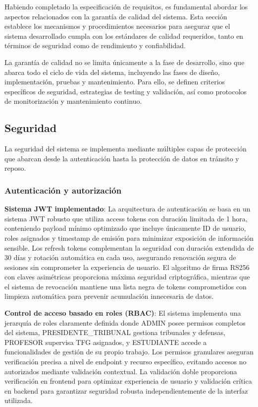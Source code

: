 \documentclass[12pt,a4paper,oneside]{report}
\begin{document}
Habiendo completado la especificación de requisitos, es fundamental
abordar los aspectos relacionados con la garantía de calidad del
sistema. Esta sección establece los mecanismos y procedimientos
necesarios para asegurar que el sistema desarrollado cumpla con los
estándares de calidad requeridos, tanto en términos de seguridad como de
rendimiento y confiabilidad.

La garantía de calidad no se limita únicamente a la fase de desarrollo,
sino que abarca todo el ciclo de vida del sistema, incluyendo las fases
de diseño, implementación, pruebas y mantenimiento. Para ello, se
definen criterios específicos de seguridad, estrategias de testing y
validación, así como protocolos de monitorización y mantenimiento
continuo.

\subsection{Seguridad}\label{seguridad-1}

La seguridad del sistema se implementa mediante múltiples capas de
protección que abarcan desde la autenticación hasta la protección de
datos en tránsito y reposo.

\subsubsection{Autenticación y
autorización}\label{autenticaciuxf3n-y-autorizaciuxf3n}

\textbf{Sistema JWT implementado}: La arquitectura de autenticación se basa en un sistema JWT robusto que utiliza access tokens con duración limitada de 1 hora, conteniendo payload mínimo optimizado que incluye únicamente ID de usuario, roles asignados y timestamp de emisión para minimizar exposición de información sensible. Los refresh tokens complementan la seguridad con duración extendida de 30 días y rotación automática en cada uso, asegurando renovación segura de sesiones sin comprometer la experiencia de usuario. El algoritmo de firma RS256 con claves asimétricas proporciona máxima seguridad criptográfica, mientras que el sistema de revocación mantiene una lista negra de tokens comprometidos con limpieza automática para prevenir acumulación innecesaria de datos.

\textbf{Control de acceso basado en roles (RBAC)}: El sistema implementa una jerarquía de roles claramente definida donde ADMIN posee permisos completos del sistema, PRESIDENTE_TRIBUNAL gestiona tribunales y defensas, PROFESOR supervisa TFG asignados, y ESTUDIANTE accede a funcionalidades de gestión de su propio trabajo. Los permisos granulares aseguran verificación precisa a nivel de endpoint y recurso específico, evitando accesos no autorizados mediante validación contextual. La validación doble proporciona verificación en frontend para optimizar experiencia de usuario y validación crítica en backend para garantizar seguridad robusta independientemente de la interfaz utilizada.
\end{document}

